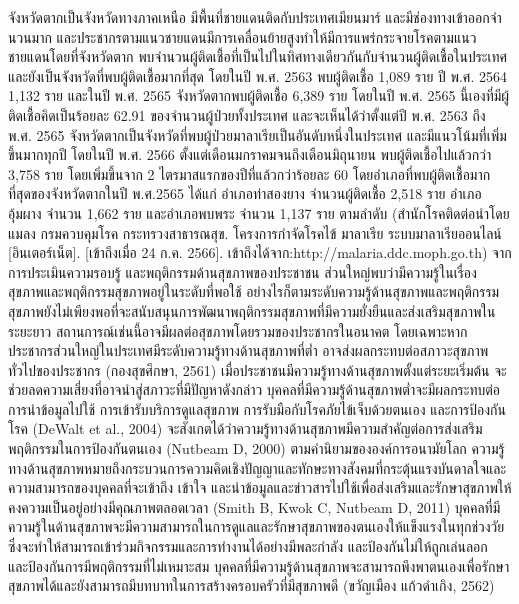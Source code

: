 \begin{titlepage}
\begin{flushleft}
\begin{enumerate}
{    จังหวัดตากเป็นจังหวัดทางภาคเหนือ มีพื้นที่ชายแดนติดกับประเทศเมียนมาร์  และมีช่องทางเข้าออกจํานวนมาก และประชากรตามแนวชายแดนมีการเคลื่อนย้ายสูงทําให้มีการแพร่กระจายโรคตามแนวชายแดนโดยที่จังหวัดตาก พบจำนวนผู้ติดเชื้อที่เป็นไปในทิศทางเดียวกันกับจำนวนผู้ติดเชื้อในประเทศ และยังเป็นจังหวัดที่พบผู้ติดเชื้อมากที่สุด โดยในปี พ.ศ. 2563 พบผู้ติดเชื้อ 1,089 ราย ปี พ.ศ. 2564 1,132 ราย และในปี พ.ศ. 2565 จังหวัดตากพบผู้ติดเชื้อ 6,389 ราย  โดยในปี พ.ศ. 2565 นี้เองที่มีผู้ติดเชื้อคิดเป็นร้อยละ 62.91 ของจำนวนผู้ป่วยทั้งประเทศ และจะเห็นได้ว่าตั้งแต่ปี พ.ศ. 2563 ถึง พ.ศ. 2565 จังหวัดตากเป็นจังหวัดที่พบผู้ป่วยมาลาเรียเป็นอันดับหนึ่งในประเทศ และมีแนวโน้มที่เพิ่มขึ้นมากทุกปี โดยในปี พ.ศ. 2566 ตั้งแต่เดือนมกราคมจนถึงเดือนมิถุนายน พบผู้ติดเชื้อไปแล้วกว่า 3,758 ราย โดยเพิ่มขึ้นจาก 2 ไตรมาสแรกของปีที่แล้วกว่าร้อยละ 60 โดยอำเภอที่พบผู้ติดเชื้อมากที่สุดของจังหวัดตากในปี พ.ศ.2565 ได้แก่ อำเภอท่าสองยาง จำนวนผู้ติดเชื้อ 2,518 ราย อำเภออุ้มผาง จำนวน 1,662 ราย และอำเภอพบพระ จำนวน 1,137 ราย ตามลำดับ (สํานักโรคติดต่อนําโดยแมลง  กรมควบคุมโรค กระทรวงสาธารณสุข.  โครงการกําจัดโรคไข้  มาลาเรีย ระบบมาลาเรียออนไลน์ [อินเตอร์เน็ต]. [เข้าถึงเมื่อ  24  ก.ค.  2566].  เข้าถึงได้จาก:http://malaria.ddc.moph.go.th)  
    จากการประเมินความรอบรู้ และพฤติกรรมด้านสุขภาพของประชาชน ส่วนใหญ่พบว่ามีความรู้ในเรื่องสุขภาพและพฤติกรรมสุขภาพอยู่ในระดับที่พอใช้ อย่างไรก็ตามระดับความรู้ด้านสุขภาพและพฤติกรรมสุขภาพยังไม่เพียงพอที่จะสนับสนุนการพัฒนาพฤติกรรมสุขภาพที่มีความยั่งยืนและส่งเสริมสุขภาพในระยะยาว สถานการณ์เช่นนี้อาจมีผลต่อสุขภาพโดยรวมของประชากรในอนาคต โดยเฉพาะหากประชากรส่วนใหญ่ในประเทศมีระดับความรู้ทางด้านสุขภาพที่ต่ำ อาจส่งผลกระทบต่อสภาวะสุขภาพทั่วไปของประชากร (กองสุขศึกษา, 2561) เมื่อประชาชนมีความรู้ทางด้านสุขภาพตั้งแต่ระยะเริ่มต้น จะช่วยลดความเสี่ยงที่อาจนำสู่สภาวะที่มีปัญหาดังกล่าว บุคคลที่มีความรู้ด้านสุขภาพต่ำจะมีผลกระทบต่อการนำข้อมูลไปใช้ การเข้ารับบริการดูแลสุขภาพ การรับมือกับโรคภัยไข้เจ็บด้วยตนเอง และการป้องกันโรค (DeWalt et al., 2004) จะสังเกตได้ว่าความรู้ทางด้านสุขภาพมีความสำคัญต่อการส่งเสริมพฤติกรรมในการป้องกันตนเอง (Nutbeam D, 2000) ตามคำนิยามขององค์การอนามัยโลก ความรู้ทางด้านสุขภาพหมายถึงกระบวนการความคิดเชิงปัญญาและทักษะทางสังคมที่กระตุ้นแรงบันดาลใจและความสามารถของบุคคลที่จะเข้าถึง เข้าใจ และนำข้อมูลและข่าวสารไปใช้เพื่อส่งเสริมและรักษาสุขภาพให้คงความเป็นอยู่อย่างมีคุณภาพตลอดเวลา (Smith B, Kwok C, Nutbeam D, 2011) บุคคลที่มีความรู้ในด้านสุขภาพจะมีความสามารถในการดูแลและรักษาสุขภาพของตนเองให้แข็งแรงในทุกช่วงวัย ซึ่งจะทำให้สามารถเข้าร่วมกิจกรรมและการทำงานได้อย่างมีพละกำลัง และป้องกันไม่ให้ถูกเล่นลอก และป้องกันการมีพฤติกรรมที่ไม่เหมาะสม บุคคลที่มีความรู้ด้านสุขภาพจะสามารถพึงพาตนเองเพื่อรักษาสุขภาพได้และยังสามารถมีบทบาทในการสร้างครอบครัวที่มีสุขภาพดี (ขวัญเมือง แก้วดำเกิง, 2562) 
}
\end{enumerate}
\end{flushleft}
\end{titlepage}
